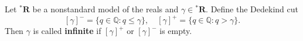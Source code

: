 Let ${^*\mathbf{R}}$ be a nonstandard model of the reals and $\gamma \in {^*\mathbf{R}}$. Define the Dedekind cut
$$[\gamma]^- = \{q \in \mathbb{Q} : q \leq \gamma\}, \quad [\gamma]^+ = \{q \in \mathbb{Q} : q > \gamma\}.$$
Then $\gamma$ is called \textbf{infinite} if $[\gamma]^+$ or $[\gamma]^-$ is empty.
